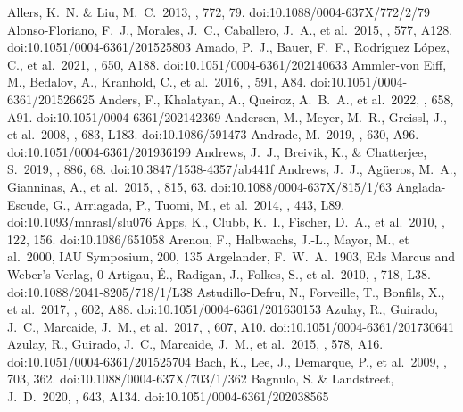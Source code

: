 \documentclass[twocolumn,tighten,twocolappendix]{aastex631}
\begin{document}
\begin{thebibliography}{}
 Allers, K.~N. \& Liu, M.~C.\ 2013, \apj, 772, 79. doi:10.1088/0004-637X/772/2/79
 Alonso-Floriano, F.~J., Morales, J.~C., Caballero, J.~A., et al.\ 2015, \aap, 577, A128. doi:10.1051/0004-6361/201525803
 Amado, P.~J., Bauer, F.~F., Rodr{\'\i}guez L{\'o}pez, C., et al.\ 2021, \aap, 650, A188. doi:10.1051/0004-6361/202140633
 Ammler-von Eiff, M., Bedalov, A., Kranhold, C., et al.\ 2016, \aap, 591, A84. doi:10.1051/0004-6361/201526625
 Anders, F., Khalatyan, A., Queiroz, A.~B.~A., et al.\ 2022, \aap, 658, A91. doi:10.1051/0004-6361/202142369
 Andersen, M., Meyer, M.~R., Greissl, J., et al.\ 2008, \apjl, 683, L183. doi:10.1086/591473
 Andrade, M.\ 2019, \aap, 630, A96. doi:10.1051/0004-6361/201936199
 Andrews, J.~J., Breivik, K., \& Chatterjee, S.\ 2019, \apj, 886, 68. doi:10.3847/1538-4357/ab441f
 Andrews, J.~J., Ag{\"u}eros, M.~A., Gianninas, A., et al.\ 2015, \apj, 815, 63. doi:10.1088/0004-637X/815/1/63
 Anglada-Escude, G., Arriagada, P., Tuomi, M., et al.\ 2014, \mnras, 443, L89. doi:10.1093/mnrasl/slu076
 Apps, K., Clubb, K.~I., Fischer, D.~A., et al.\ 2010, \pasp, 122, 156. doi:10.1086/651058
 Arenou, F., Halbwachs, J.-L., Mayor, M., et al.\ 2000, IAU Symposium, 200, 135
 Argelander, F.~W.~A.\ 1903, Eds Marcus and Weber's Verlag, 0
 Artigau, {\'E}., Radigan, J., Folkes, S., et al.\ 2010, \apjl, 718, L38. doi:10.1088/2041-8205/718/1/L38
 Astudillo-Defru, N., Forveille, T., Bonfils, X., et al.\ 2017, \aap, 602, A88. doi:10.1051/0004-6361/201630153
 Azulay, R., Guirado, J.~C., Marcaide, J.~M., et al.\ 2017, \aap, 607, A10. doi:10.1051/0004-6361/201730641
 Azulay, R., Guirado, J.~C., Marcaide, J.~M., et al.\ 2015, \aap, 578, A16. doi:10.1051/0004-6361/201525704
 Bach, K., Lee, J., Demarque, P., et al.\ 2009, \apj, 703, 362. doi:10.1088/0004-637X/703/1/362
 Bagnulo, S. \& Landstreet, J.~D.\ 2020, \aap, 643, A134. doi:10.1051/0004-6361/202038565

\end{thebibliography}
\end{document}
